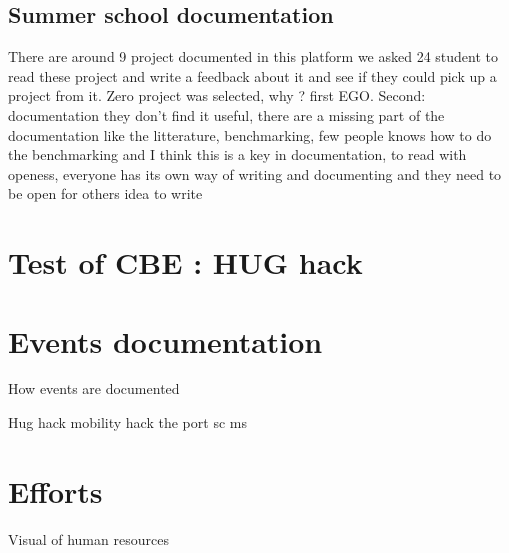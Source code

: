\subsection{Summer school documentation}
There are around 9 project documented in this platform
we asked 24 student to read these project and write a feedback about it and see if they could pick up a project from it.
Zero project was selected, why ?
first EGO. 
Second: documentation they don't find it useful, there are a missing part of the documentation like the litterature, benchmarking, few people knows how to do the benchmarking and I think this is a key in documentation,  to read with openess, everyone has its own way of writing and documenting and they need to be open for others idea to write 
\label{sec:scdocumentation}
\section{Test of CBE : HUG hack}

\section{Events documentation}

How events are documented

Hug hack
mobility hack
the port
sc
ms


\section{Efforts}
Visual of human resources 
